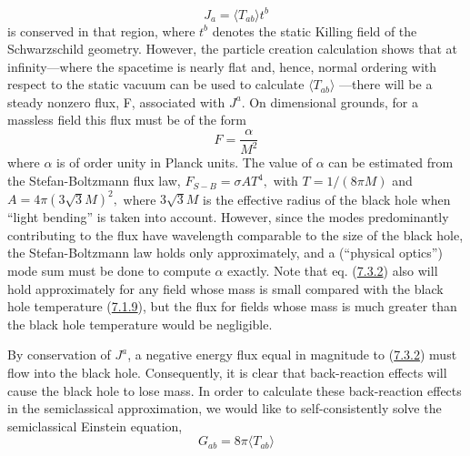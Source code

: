 \documentclass[11pt,a4paper]{article}
\begin{document}
\hypertarget{source-189}{}
\begin{equation*}
J_a = \langle T_{ab} \rangle t^b \tag{7.3.1}\label{eq:7.3.1}
\end{equation*}
is conserved in that region, where \(t^b\) denotes the static Killing field of the Schwarzschild geometry. However, the particle creation calculation shows that at infinity---where the spacetime is nearly flat and, hence, normal ordering with respect to the static vacuum can be used to calculate \(\langle T_{ab}\rangle \) ---there will be a steady nonzero flux, F, associated with \(J^a\). On dimensional grounds, for a massless field this flux must be of the form
\begin{equation*}
F = \frac{\alpha}{M^2} \tag{7.3.2}\label{eq:7.3.2}
\end{equation*}
where \(\alpha\) is of order unity in Planck units. The value of \(\alpha\) can be estimated from the Stefan-Boltzmann flux law, \(F_{S-B}=\sigma AT^4,\) with \(T=1/(8\pi M)\) and \(A=4\pi\left(3\sqrt{3}M\right)^2,\) where \(3\sqrt{3} M\) is the effective radius of the black hole when ``light bending'' is taken into account. However, since the modes predominantly contributing to the flux have wavelength comparable to the size of the black hole, the Stefan-Boltzmann law holds only approximately, and a (``physical optics'') mode sum must be done to compute \(\alpha\) exactly. Note that eq. (\hyperref[eq:7.3.2]{7.3.2}) also will hold approximately for any field whose mass is small compared with the black hole temperature (\hyperref[eq:7.1.9]{7.1.9}), but the flux for fields whose mass is much greater than the black hole temperature would be negligible.

By conservation of \(J^a\), a negative energy flux equal in magnitude to (\hyperref[eq:7.3.2]{7.3.2}) must flow into the black hole. Consequently, it is clear that back-reaction effects will cause the black hole to lose mass. In order to calculate these back-reaction effects in the semiclassical approximation, we would like to self-consistently solve the semiclassical Einstein equation,
\begin{equation*}
G_{ab} = 8\pi \langle T_{ab}\rangle \tag{7.3.3}\label{eq:7.3.3}
\end{equation*}
\end{document}
